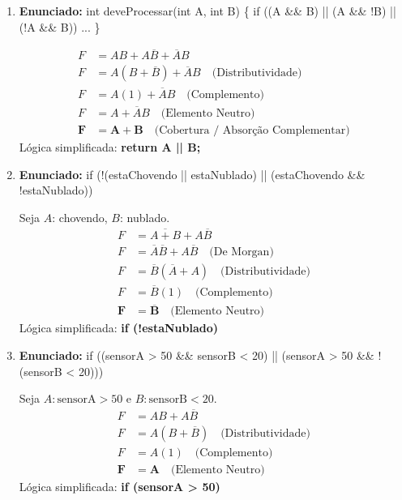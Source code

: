 \documentclass[12pt]{article}
\begin{document}
\begin{enumerate}[label=\textbf{\arabic*.}]
\item \textbf{Enunciado:} int deveProcessar(int A, int B) \{ if ((A \&\& B) || (A \&\& !B) || (!A \&\& B)) ... \}
\begin{solucao}
\begin{align*}
    F &= AB + A\overline{B} + \overline{A}B \\
    F &= A(B + \overline{B}) + \overline{A}B \quad \text{(Distributividade)} \\
    F &= A(1) + \overline{A}B \quad \text{(Complemento)} \\
    F &= A + \overline{A}B \quad \text{(Elemento Neutro)} \\
    \mathbf{F} &= \mathbf{A + B} \quad \text{(Cobertura / Absorção Complementar)}
\end{align*}
Lógica simplificada: \textbf{return A || B;}
\end{solucao}

\item \textbf{Enunciado:} if (!(estaChovendo || estaNublado) || (estaChovendo \&\& !estaNublado))
\begin{solucao}
Seja $A$: chovendo, $B$: nublado.
\begin{align*}
    F &= \overline{A + B} + A\overline{B} \\
    F &= \overline{A}\overline{B} + A\overline{B} \quad \text{(De Morgan)} \\
    F &= \overline{B}(\overline{A} + A) \quad \text{(Distributividade)} \\
    F &= \overline{B}(1) \quad \text{(Complemento)} \\
    \mathbf{F} &= \mathbf{\overline{B}} \quad \text{(Elemento Neutro)}
\end{align*}
Lógica simplificada: \textbf{if (!estaNublado)}
\end{solucao}

\item \textbf{Enunciado:} if ((sensorA > 50 \&\& sensorB < 20) || (sensorA > 50 \&\& !(sensorB < 20)))
\begin{solucao}
Seja $A: \text{sensorA} > 50$ e $B: \text{sensorB} < 20$.
\begin{align*}
    F &= AB + A\overline{B} \\
    F &= A(B + \overline{B}) \quad \text{(Distributividade)} \\
    F &= A(1) \quad \text{(Complemento)} \\
    \mathbf{F} &= \mathbf{A} \quad \text{(Elemento Neutro)}
\end{align*}
Lógica simplificada: \textbf{if (sensorA > 50)}
\end{solucao}


\end{enumerate}
\end{document}
